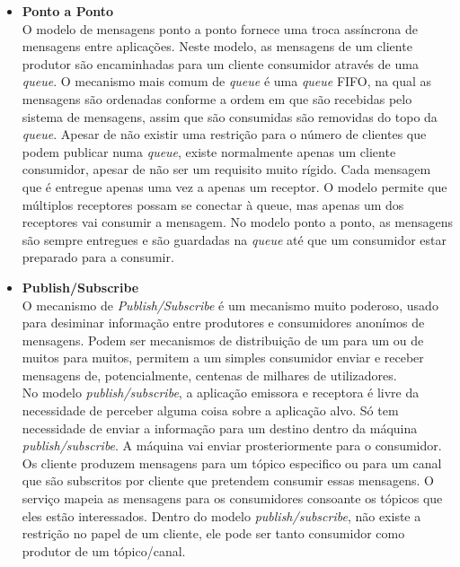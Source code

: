 \begin{itemize}
\item \textbf{Ponto a Ponto}\\
O modelo de mensagens ponto a ponto fornece uma troca assíncrona de mensagens entre aplicações. Neste modelo, as mensagens de um cliente produtor são encaminhadas para um cliente consumidor através de uma \textit{queue}. O mecanismo mais comum de \textit{queue} é uma \textit{queue} FIFO, na qual as mensagens são ordenadas conforme a ordem em que são recebidas pelo sistema de mensagens, assim que são consumidas são removidas do topo da \textit{queue}. 
Apesar de não existir uma restrição para o número de clientes que podem publicar numa \textit{queue}, existe normalmente apenas um cliente consumidor, apesar de não ser um requisito muito rígido. Cada mensagem que é entregue apenas uma vez a apenas um receptor. O modelo permite que múltiplos receptores possam se conectar à queue, mas apenas um dos receptores vai consumir a mensagem. No modelo ponto a ponto, as mensagens são sempre entregues e são guardadas na \textit{queue} até que um consumidor estar preparado para a consumir.  
\item \textbf{Publish/Subscribe}\\
O mecanismo  de \textit{Publish/Subscribe} é um mecanismo muito poderoso, usado para desiminar informação entre produtores e consumidores anonímos de mensagens. Podem ser mecanismos de distribuição de um para um ou de muitos para muitos, permitem a um simples consumidor enviar e receber mensagens de, potencialmente, centenas de milhares de utilizadores.\\
No modelo \textit{publish/subscribe}, a aplicação emissora e receptora é livre da necessidade de perceber alguma coisa sobre a aplicação alvo.  Só tem necessidade de enviar a informação para um destino dentro da máquina \textit{publish/subscribe}. A máquina vai enviar prosteriormente para o consumidor. Os cliente produzem mensagens para um tópico especifico ou para um canal que são subscritos por cliente que pretendem consumir essas mensagens. O serviço mapeia as mensagens para os consumidores consoante os tópicos que eles estão interessados. Dentro do modelo \textit{publish/subscribe}, não existe a restrição no papel de um cliente, ele pode ser tanto consumidor como produtor de um tópico/canal.\\
\end{itemize}
